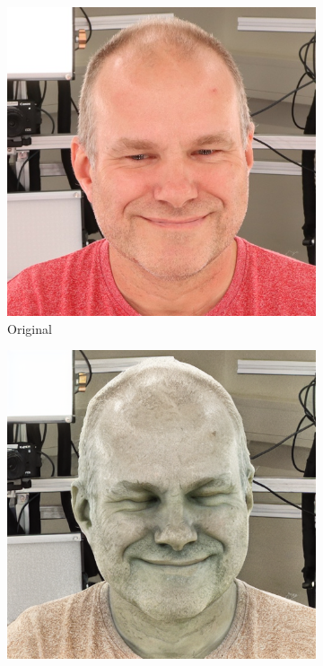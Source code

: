 \begin{figure}
    \begin{subfigure}{0.18\linewidth}
        \includegraphics[width=\textwidth]{Figures/resized_images/0-2-4-2-293_210300_829.JPG}
		\caption{Original}
	\end{subfigure}
    \begin{subfigure}{0.18\linewidth}
        \includegraphics[width=\textwidth]{Figures/naive/default/ipix2pix_sven_stone/0-2-4-2-293_210300_829.png}

\end{subfigure}
\end{figure}
